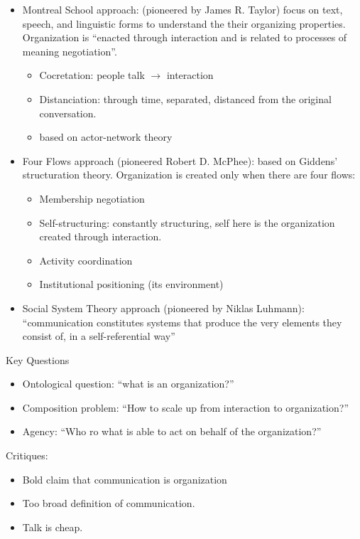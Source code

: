 \documentclass[
]{book}
\providecommand{\tightlist}{%
  \setlength{\itemsep}{0pt}\setlength{\parskip}{0pt}}
\begin{document}
\begin{itemize}
\item
  Montreal School approach: (pioneered by James R. Taylor) focus on text, speech, and linguistic forms to understand the their organizing properties.
  Organization is ``enacted through interaction and is related to processes of meaning negotiation''.

  \begin{itemize}
  \tightlist
  \item
    Cocretation: people talk \(\to\) interaction
  \item
    Distanciation: through time, separated, distanced from the original conversation.
  \item
    based on actor-network theory
  \end{itemize}
\item
  Four Flows approach (pioneered Robert D. McPhee): based on Giddens' structuration theory.
  Organization is created only when there are four flows:

  \begin{itemize}
  \tightlist
  \item
    Membership negotiation
  \item
    Self-structuring: constantly structuring, self here is the organization created through interaction.
  \item
    Activity coordination
  \item
    Institutional positioning (its environment)
  \end{itemize}
\item
  Social System Theory approach (pioneered by Niklas Luhmann): ``communication constitutes systems that produce the very elements they consist of, in a self-referential way''
\end{itemize}

Key Questions

\begin{itemize}
\tightlist
\item
  Ontological question: ``what is an organization?''
\item
  Composition problem: ``How to scale up from interaction to organization?''
\item
  Agency: ``Who ro what is able to act on behalf of the organization?''
\end{itemize}

Critiques:

\begin{itemize}
\tightlist
\item
  Bold claim that communication is organization
\item
  Too broad definition of communication.
\item
  Talk is cheap.
\end{itemize}
\end{document}
